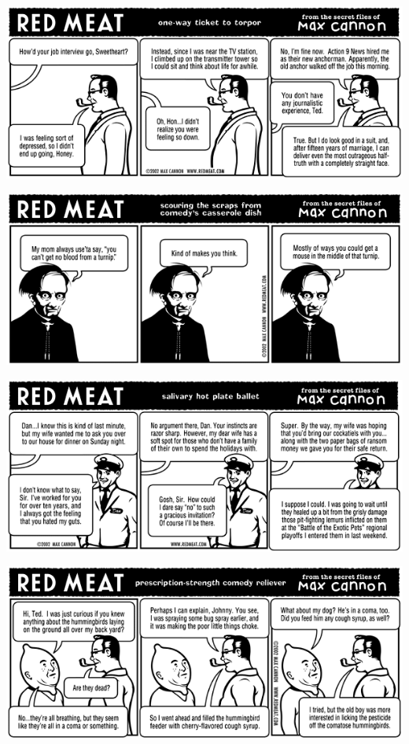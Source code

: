 \documentclass[a4paper,twoside,11pt]{article}
\begin{document}
\includegraphics[width=\textwidth]{redmeat_2002-11-26.png}



\includegraphics[width=\textwidth]{redmeat_2002-12-03.png}



\includegraphics[width=\textwidth]{redmeat_2002-12-10.png}



\includegraphics[width=\textwidth]{redmeat_2002-12-17.png}
\end{document}
